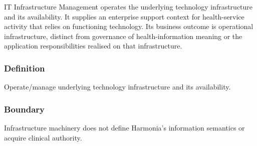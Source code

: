IT Infrastructure Management operates the underlying technology infrastructure and its availability. It supplies an enterprise support context for health-service activity that relies on functioning technology. Its business outcome is operational infrastructure, distinct from governance of health-information meaning or the application responsibilities realised on that infrastructure.

\subsubsection*{Definition}

Operate/\allowbreak{}manage underlying technology infrastructure and its availability.

\subsubsection*{Boundary}

Infrastructure machinery does not define Harmonia's information semantics or acquire clinical authority.

